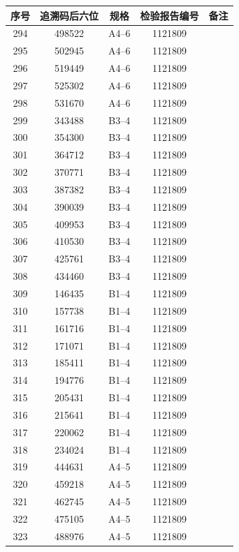 \documentclass[UTF8,10pt,a4paper,fontset=fandol]{ctexart}
\begin{document}
\begin{center}
\begin{tabular}{|c|c|c|c|p{3.0cm}|}
\hline
序号 & 追溯码后六位 & 规格 & 检验报告编号 & 备注 \\
\hline
294 & 498522 & A4--6 & 1121809 & \\
\hline
295 & 502945 & A4--6 & 1121809 & \\
\hline
296 & 519449 & A4--6 & 1121809 & \\
\hline
297 & 525302 & A4--6 & 1121809 & \\
\hline
298 & 531670 & A4--6 & 1121809 & \\
\hline
299 & 343488 & B3--4 & 1121809 & \\
\hline
300 & 354300 & B3--4 & 1121809 & \\
\hline
301 & 364712 & B3--4 & 1121809 & \\
\hline
302 & 370771 & B3--4 & 1121809 & \\
\hline
303 & 387382 & B3--4 & 1121809 & \\
\hline
304 & 390039 & B3--4 & 1121809 & \\
\hline
305 & 409953 & B3--4 & 1121809 & \\
\hline
306 & 410530 & B3--4 & 1121809 & \\
\hline
307 & 425761 & B3--4 & 1121809 & \\
\hline
308 & 434460 & B3--4 & 1121809 & \\
\hline
309 & 146435 & B1--4 & 1121809 & \\
\hline
310 & 157738 & B1--4 & 1121809 & \\
\hline
311 & 161716 & B1--4 & 1121809 & \\
\hline
312 & 171071 & B1--4 & 1121809 & \\
\hline
313 & 185411 & B1--4 & 1121809 & \\
\hline
314 & 194776 & B1--4 & 1121809 & \\
\hline
315 & 205431 & B1--4 & 1121809 & \\
\hline
316 & 215641 & B1--4 & 1121809 & \\
\hline
317 & 220062 & B1--4 & 1121809 & \\
\hline
318 & 234024 & B1--4 & 1121809 & \\
\hline
319 & 444631 & A4--5 & 1121809 & \\
\hline
320 & 459218 & A4--5 & 1121809 & \\
\hline
321 & 462745 & A4--5 & 1121809 & \\
\hline
322 & 475105 & A4--5 & 1121809 & \\
\hline
323 & 488976 & A4--5 & 1121809 & \\

\end{tabular}
\end{center}
\end{document}
